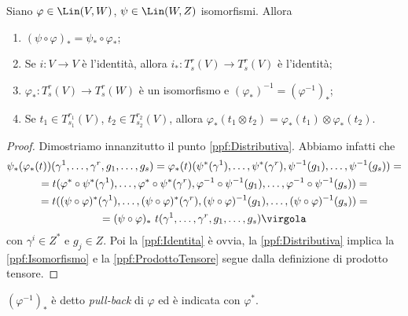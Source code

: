 \begin{proposition} \label{prop:ProprietaPushForward}
	Siano $\varphi\in \Lin(V,W)$, $\psi\in \Lin(W,Z)$ isomorfismi. Allora
	\begin{enumerate}
	 \item $(\psi\circ\varphi)_* = \psi_*\circ \varphi_*$; \label{ppf:Distributiva}
	 \item Se $i:V\to V$ è l'identità, allora $i_*:T_s^r(V) \to T_s^r(V)$ è l'identità; \label{ppf:Identita}
	 \item $\varphi_*:T_s^r(V) \to T_s^r(W)$ è un isomorfismo e $(\varphi_*)^{-1} = (\varphi^{-1})_*$; \label{ppf:Isomorfismo}
	 \item Se $t_1\in T_{s_1}^{r_1}(V)$, $t_2\in T_{s_2}^{r_2}(V)$, allora $\varphi_*(t_1\otimes t_2) = \varphi_*(t_1)\otimes \varphi_*(t_2)$. \label{ppf:ProdottoTensore}
	\end{enumerate}
\end{proposition}
\begin{proof}
	Dimostriamo innanzitutto il punto \ref{ppf:Distributiva}. Abbiamo infatti che
	\begin{multline*}
		\psi_*(\varphi_*(t)) (\gamma^1,\ldots,\gamma^r,g_1,\ldots,g_s) = \varphi_*(t) (\psi^*(\gamma^1),\ldots,\psi^*(\gamma^r), \psi^{-1}(g_1),\ldots, \psi^{-1}(g_s)) =\\
		= t(\varphi^*\circ \psi^*(\gamma^1),\ldots, \varphi^*\circ \psi^*(\gamma^r), \varphi^{-1}\circ \psi^{-1}(g_1), \ldots, \varphi^{-1}\circ \psi^{-1}(g_s) ) =\\
		= t((\psi\circ\varphi)^*(\gamma^1),\ldots, (\psi\circ\varphi)^*(\gamma^r), (\psi\circ\varphi)^{-1}(g_1), \ldots, (\psi\circ\varphi)^{-1}(g_s) ) = \\
		= (\psi\circ\varphi)_*\ t (\gamma^1,\ldots,\gamma^r,g_1,\ldots,g_s)\virgola
	\end{multline*}
	con $\gamma^i\in Z^*$ e $g_j\in Z$.
	Poi la \ref{ppf:Identita} è ovvia, la \ref{ppf:Distributiva} implica la \ref{ppf:Isomorfismo} e la \ref{ppf:ProdottoTensore} segue dalla definizione di prodotto tensore.
\end{proof}

\begin{definition} 
	$(\varphi^{-1})_*$ è detto \emph{pull-back} di $\varphi$ ed è indicata con $\varphi^*$.
\end{definition}

